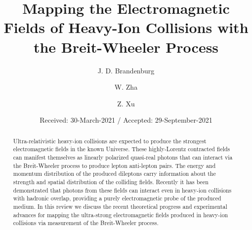 \documentclass[twocolumn,epjc3]{svjour3}\sloppy
\begin{document}
\title{Mapping the Electromagnetic Fields of Heavy-Ion Collisions with the Breit-Wheeler Process %
}

\author{J. D. Brandenburg
        \and
        W. Zha %
        \and
        Z. Xu 
}




\date{Received: 30-March-2021 / Accepted: 29-September-2021}


\maketitle

\begin{abstract}
Ultra-relativistic heavy-ion collisions are expected to produce the strongest electromagnetic fields in the known Universe. 
These highly-Lorentz contracted fields can manifest themselves as linearly polarized quasi-real photons that can interact via the Breit-Wheeler process to produce lepton anti-lepton pairs. The energy and momentum distribution of the produced dileptons carry information about the strength and spatial distribution of the colliding fields. Recently it has been demonstrated that photons from these fields can interact even in heavy-ion collisions with hadronic overlap, providing a purely electromagnetic probe of the produced medium. In this review we discuss the recent theoretical progress and experimental advances for mapping the ultra-strong electromagnetic fields produced in heavy-ion collisions via measurement of the Breit-Wheeler process. 
\end{abstract}
\end{document}
